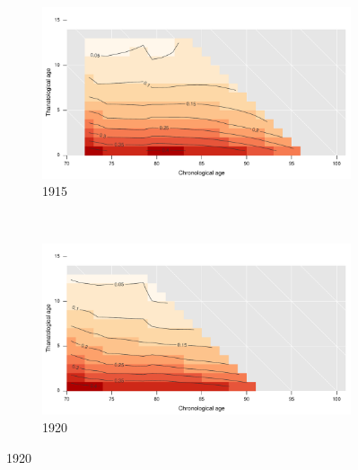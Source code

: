 \documentclass[12pt,oneside,a4paper]{article} %
\begin{document}
\begin{figure}[h!]
\begin{subfigure}{.45\textwidth}
\centering
\caption{1915}
\vspace{-1em}
\label{fig:srh1915}
\includegraphics[scale=0.3]{Figures/TALapplication/srhpoor1915.pdf}
\end{subfigure}
~
\begin{subfigure}{.45\textwidth}
\centering
\caption{1920}
\vspace{-1em}
\label{fig:srh1920}
\includegraphics[scale=0.3]{Figures/TALapplication/srhpoor1920.pdf}
\end{subfigure}


\end{figure}
\end{document}
